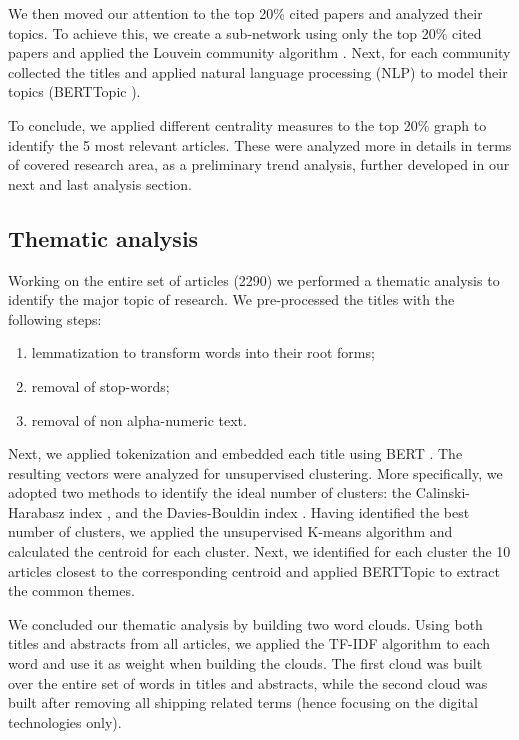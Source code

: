 \documentclass[a4paper, review, endfloat, doubleblind, authoryear]{elsarticle}
\begin{document}
	We then moved our attention to the top 20\% cited papers and analyzed their topics. To achieve this, we create a sub-network using only the top 20\% cited papers and applied the Louvein community algorithm \citep{blondel2008fast}. Next, for each community collected the titles and applied natural language processing (NLP) to model their topics (BERTTopic \citep{paulcombining}).
	
	To conclude, we applied different centrality measures to the top 20\% graph to identify the 5 most relevant articles. These were analyzed more in details in terms of covered research area, as a preliminary trend analysis, further developed in our next and last analysis section.
	
	\subsection{Thematic analysis}
	Working on the entire set of articles (2290) we performed a thematic analysis to identify the major topic of research. We pre-processed the titles with the following steps:
	\begin{enumerate}
		\item lemmatization to transform words into their root forms;
		\item removal of stop-words;
		\item removal of non alpha-numeric text.
	\end{enumerate}
	Next, we applied tokenization and embedded each title using BERT \citep{devlin2018bert}. The resulting vectors were analyzed for unsupervised clustering. More specifically, we adopted two methods to identify the ideal number of clusters: the Calinski-Harabasz index \citep{calinski1974dendrite}, and the Davies-Bouldin index \citep{davies1979cluster}.
	Having identified the best number of clusters, we applied the unsupervised K-means algorithm and calculated the centroid for each cluster.
	Next, we identified for each cluster the 10 articles closest to the corresponding centroid and applied BERTTopic to extract the common themes.
	
	We concluded our thematic analysis by building two word clouds. Using both titles and abstracts from all articles, we applied the TF-IDF algorithm to each word and use it as weight when building the clouds. The first cloud was built over the entire set of words in titles and abstracts, while the second cloud was built after removing all shipping related terms (hence focusing on the digital technologies only).
	
\end{document}
